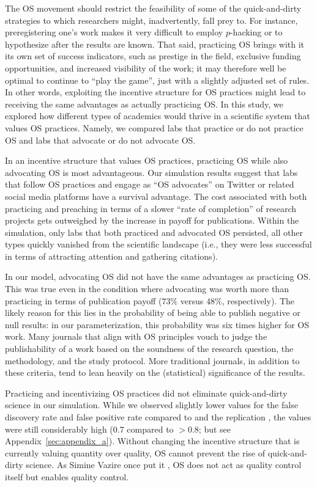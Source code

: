 \documentclass[meta, authordate,issue]{jote-new-article}
\begin{document}
The OS movement should restrict the feasibility of some of the quick-and-dirty strategies to which researchers might, inadvertently, fall prey to. For instance, preregistering one's work makes it very difficult to employ $p$-hacking or to hypothesize after the results are known. That said, practicing OS brings with it its own set of success indicators, such as prestige in the field, exclusive funding opportunities, and increased visibility of the work; it may therefore well be optimal to continue to ``play the game'', just with a slightly adjusted set of rules. In other words, exploiting the incentive structure for OS practices might lead to receiving the same advantages as actually practicing OS. In this study, we explored how different types of academics would thrive in a scientific system that values OS practices. Namely, we compared labs that practice or do not practice OS and labs that advocate or do not advocate OS.

In an incentive structure that values OS practices, practicing OS while also advocating OS is most advantageous. Our simulation results suggest that labs that follow OS practices and engage as ``OS advocates'' on Twitter or related social media platforms have a survival advantage. The cost associated with both practicing and preaching in terms of a slower ``rate of completion'' of research projects gets outweighed by the increase in payoff for publications. Within the simulation, only labs that both practiced and advocated OS persisted, all other types quickly vanished from the scientific landscape (i.e., they were less successful in terms of attracting attention and gathering citations).

In our model, advocating OS did not have the same advantages as practicing OS. This was true even in the condition where advocating was worth more than practicing in terms of publication payoff ($73\%$ versus $48\%$, respectively). The likely reason for this lies in the probability of being able to publish negative or null results: in our parameterization, this probability was six times higher for OS work. Many journals that align with OS principles vouch to judge the publishability of a work based on the soundness of the research question, the methodology, and the study protocol. More traditional journals, in addition to these criteria, tend to lean heavily on the (statistical) significance of the results.

Practicing and incentivizing OS practices did not eliminate quick-and-dirty science in our simulation. While we observed slightly lower values for the false discovery rate and false positive rate compared to \textcite{SmaldinoMcelreath2016} and the replication \parencite{KohrtSmaldinoMcelreath_2022preprint}, the values were still considerably high ($0.7$ compared to $>0.8$; but see Appendix~\ref{sec:appendix_a}). Without changing the incentive structure that is currently valuing quantity over quality, OS cannot prevent the rise of quick-and-dirty science. As Simine Vazire once put it \parencite{vazire_open_2020}, OS does not act as quality control itself but enables quality control.
\end{document}
